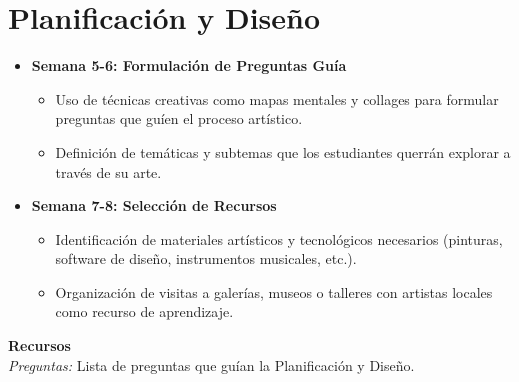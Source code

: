 \newpage
\section{Planificación y Diseño}
\begin{itemize}
  \item \textbf{Semana 5-6: Formulación de Preguntas Guía}
  \begin{itemize}
    \item Uso de técnicas creativas como mapas mentales y collages para formular preguntas que guíen el proceso artístico.
    \item Definición de temáticas y subtemas que los estudiantes querrán explorar a través de su arte.
  \end{itemize}
  \item \textbf{Semana 7-8: Selección de Recursos}
  \begin{itemize}
    \item Identificación de materiales artísticos y tecnológicos necesarios (pinturas, software de diseño, instrumentos musicales, etc.).
    \item Organización de visitas a galerías, museos o talleres con artistas locales como recurso de aprendizaje.
  \end{itemize}
\end{itemize}
{\large \textbf{Recursos}}\\
\textit{Preguntas:} Lista de preguntas que guían la Planificación y Diseño.
